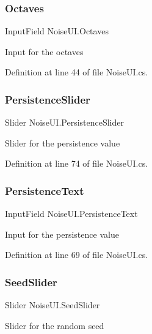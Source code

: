 \subsubsection{Octaves}
{\footnotesize\ttfamily Input\+Field Noise\+U\+I.\+Octaves}



Input for the octaves 



Definition at line 44 of file Noise\+U\+I.\+cs.

\mbox{\label{class_noise_u_i_aff4200e30ce76aa8aecd4af8fc58d8fe}} 
\subsubsection{Persistence\+Slider}
{\footnotesize\ttfamily Slider Noise\+U\+I.\+Persistence\+Slider}



Slider for the persistence value 



Definition at line 74 of file Noise\+U\+I.\+cs.

\mbox{\label{class_noise_u_i_a220205af2d990f38210fe56d72a46be5}} 
\subsubsection{Persistence\+Text}
{\footnotesize\ttfamily Input\+Field Noise\+U\+I.\+Persistence\+Text}



Input for the persistence value 



Definition at line 69 of file Noise\+U\+I.\+cs.

\mbox{\label{class_noise_u_i_a9577e3a1518d00a7a88ff3167ca0e49a}} 
\subsubsection{Seed\+Slider}
{\footnotesize\ttfamily Slider Noise\+U\+I.\+Seed\+Slider}



Slider for the random seed 



